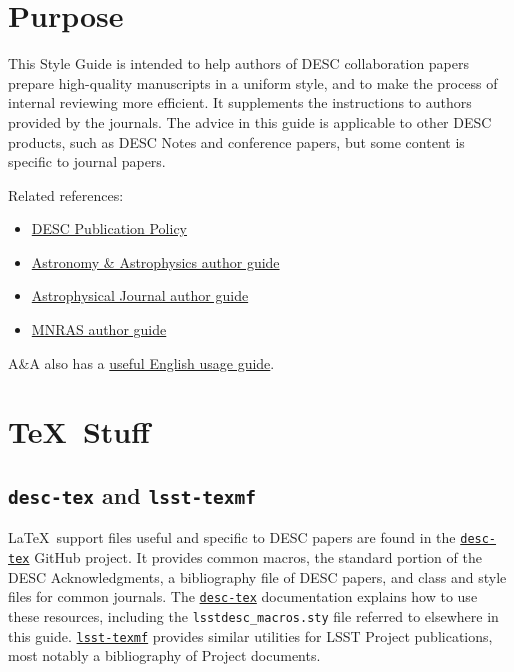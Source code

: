 \documentclass[letterpaper,11pt]{article}
\begin{document}
\section{Purpose}

This Style Guide is intended to help authors of DESC collaboration papers prepare
high-quality manuscripts in a uniform style, and to make the process of internal reviewing more efficient. It supplements the instructions
to authors provided by the journals.  The advice in this guide is applicable to other DESC products, such as DESC Notes and conference papers, but some content is specific to journal papers.

Related references:
\begin{itemize}
\item{\href{http://lsst-desc.org/sites/default/files/LSST_DESC_Publication_Policy_v6_15aug2016.pdf}{DESC Publication Policy}}

\item{\href{https://www.aanda.org/doc_journal/instructions/aadoc.pdf}{Astronomy \& Astrophysics author guide}}

\item{\href{http://journals.aas.org/authors/manuscript.html}{Astrophysical Journal author guide}}

\item \href{https://academic.oup.com/mnras/pages/General_Instructions}{MNRAS author guide}
\end{itemize}


A\&A also has a \href{http://www.aanda.org/doc_journal/instructions/aa_english_guide.pdf}{useful English usage guide}. 

\section{\TeX\ Stuff}

\subsection{{\tt desc-tex} and {\tt lsst-texmf}}

La\TeX\ support files useful and specific to DESC papers are found in
the \href{https://github.com/LSSTDESC/desc-tex}{\tt desc-tex} GitHub project.
It provides common macros, the standard portion of the DESC Acknowledgments, a bibliography file of DESC papers, and class and style files for common journals.
The \href{https://github.com/LSSTDESC/desc-tex}{\tt desc-tex} documentation explains how to use these resources, including the {\tt lsstdesc\_macros.sty} file referred to elsewhere in this guide.
\href{https://github.com/lsst/lsst-texmf}{\tt lsst-texmf} provides similar utilities for LSST Project publications, most notably a bibliography of Project documents.
\end{document}
